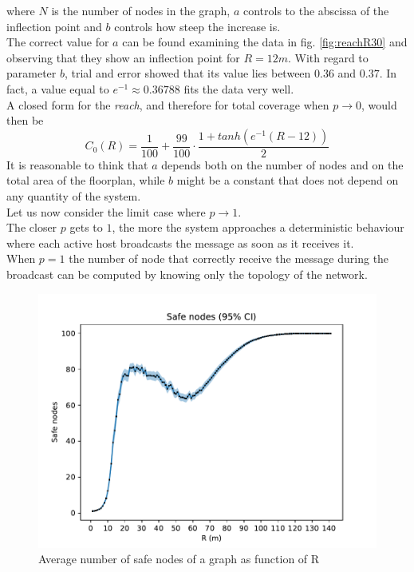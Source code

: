 \hfill \break
where $N$ is the number of nodes in the graph, $a$ controls to the abscissa of the inflection point and $b$ controls how steep the increase is.\\
The correct value for $a$ can be found examining the data in fig. \ref{fig:reachR30} and observing that they show an inflection point for $R=12m$. With regard to parameter $b$, trial and error showed that its value lies between $0.36$ and $0.37$. In fact, a value equal to $e^{-1} \approx 0.36788$ fits the data very well.\\
A closed form for the \textit{reach}, and therefore for total coverage when $p \to 0$, would then be
\hfill \break
\begin{equation}\label{eq:reachSigmoid}
	C_{0}(R) = \frac{1}{100} + \frac{99}{100}\cdot\frac{1+tanh(e^{-1}(R - 12))}{2}
\end{equation}
\hfill \break
It is reasonable to think that $a$ depends both on the number of nodes and on the total area of the floorplan, while $b$ might be a constant that does not depend on any quantity of the system.\\
\hfill \break
Let us now consider the limit case where $p \to 1$.\\
The closer $p$ gets to $1$, the more the system approaches a deterministic behaviour where each active host broadcasts the message as soon as it receives it.\\
When $p=1$ the number of node that correctly receive the message during the broadcast can be computed by knowing only the topology of the network.\\
\begin{figure}[H]
    \begin{center}
        \includegraphics[scale=.6]{img/graphAnalysisSafe_nodes.pdf}
    \end{center}
    \vspace*{-0.5cm}
    \caption{Average number of safe nodes of a graph as function of R}
    \label{fig:safeNodes}
\end{figure}

